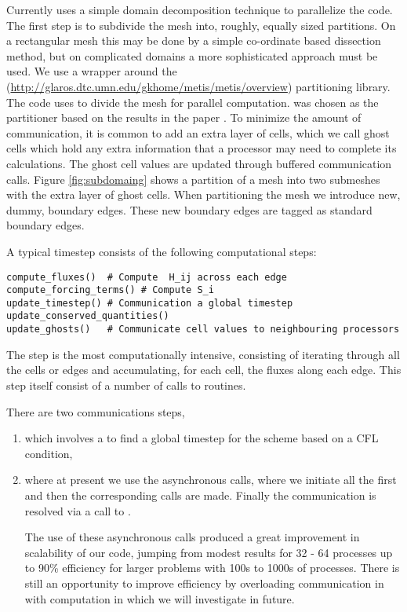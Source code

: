 \documentclass{manual}
\begin{document}
Currently \anuga uses a simple domain decomposition technique to parallelize the code.
The first step is to subdivide the mesh
into, roughly, equally sized partitions. On a rectangular mesh this may be
done by a simple co-ordinate based dissection method, but on  complicated
domains a more sophisticated approach must be used.  We use a
\Python{} wrapper around the \Metis{}
(\url{http://glaros.dtc.umn.edu/gkhome/metis/metis/overview})
partitioning library. The code uses \Metis{} to divide the mesh for
parallel computation. \Metis{} was chosen as the partitioner based on
the results in the paper \cite{karypis1999fast}.
To minimize the amount of communication, it is common to add an
extra layer of cells, which we call ghost cells which hold any extra information that
a processor may need to complete its calculations. The ghost
cell values are updated through buffered communication calls. Figure
\ref{fig:subdomaing} shows a partition of a mesh into two submeshes  with the extra layer of
ghost cells.
When partitioning the mesh we introduce new, dummy, boundary edges.
These new
boundary edges are  tagged as  standard boundary edges.


A typical timestep consists of the following computational steps:
\begin{verbatim}
compute_fluxes()  # Compute  H_ij across each edge
compute_forcing_terms() # Compute S_i
update_timestep() # Communication a global timestep
update_conserved_quantities()
update_ghosts()   # Communicate cell values to neighbouring processors
\end{verbatim}

The  step is the most computationally intensive, consisting of iterating through all the cells or edges and accumulating, for each cell,  the fluxes along each edge.  This step itself consist of a number of calls to \Python{} routines.


There are two communications steps,
\begin{enumerate}[(1)]
\item  {} which involves a  to find a global timestep for the scheme based on a CFL condition,

\item {} where at present we use the asynchronous  \MPI{}  calls, where we initiate all the   first and then the corresponding  calls are made.  Finally the communication is resolved via a call to .

The use of these asynchronous \MPI{} calls produced a great improvement in scalability of our code, jumping from modest results for 32 - 64 \MPI{} processes up to 90\% efficiency for larger problems with 100s to 1000s of \MPI{} processes. There is still an opportunity to improve efficiency by overloading communication in   with computation in  which we will investigate in future.
\end{enumerate}
\end{document}
